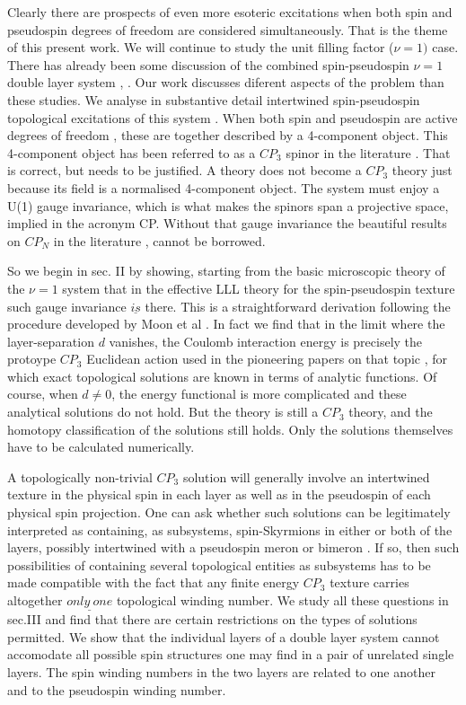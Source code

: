 Clearly there are prospects of even more esoteric excitations
when both spin and pseudospin degrees of freedom are considered
simultaneously. That is the theme of this present work. We will
continue to study the unit filling factor ($ \nu = 1 )$ case.
There has already been some discussion of the combined
spin-pseudospin $\nu = 1 $ double layer system \cite{Arov},
\cite{Ezawa}. Our work discusses diferent aspects of the
problem than these studies. We analyse in substantive detail
intertwined spin-pseudospin topological excitations of this
system . When both spin and pseudospin are active degrees of
freedom , these are together described by a 4-component object.
This 4-component object has been referred to as a $CP_{3}$
spinor in the literature \cite{Ezawa}. That is correct, but
needs to be justified. A theory does not become a $CP_{3}$
theory just because its field is a normalised 4-component
object. The system must enjoy a U(1) gauge invariance, which is
what makes the spinors span a projective space, implied in the
acronym CP. Without that gauge invariance the beautiful results
on $CP_{N}$ in the literature \cite{CP}, \cite{Raj} cannot be
borrowed. 

So we begin in sec. II by showing, starting from the basic
microscopic theory of the $\nu = 1 $ system that in the
effective LLL theory for the spin-pseudospin texture such
gauge invariance $\underline{is}$ there. This is a
straightforward derivation following the procedure developed by
Moon et al \cite{Moon}. In fact we find that in the limit where
the layer-separation $d$ vanishes, the Coulomb interaction
energy is precisely the protoype $CP_{3}$ Euclidean action used
in the pioneering papers on that topic \cite{CP}, for which
exact topological solutions are known in terms of analytic
functions. Of course, when $d\neq 0$, the energy functional is
more complicated and these analytical solutions do not hold.
But the theory is still a $CP_{3}$ theory, and the homotopy
classification of the solutions still holds. Only the solutions
themselves have to be calculated numerically. 

A topologically non-trivial $CP_{3}$ solution will generally
involve an intertwined texture in the physical spin in each
layer as well as in the pseudospin of each physical spin
projection. One can ask whether such solutions can be
legitimately interpreted as containing, as subsystems,
spin-Skyrmions in either or both of the layers, possibly
intertwined with a pseudospin meron or bimeron . If so, then
such possibilities of containing several topological entities
as subsystems has to be made compatible with the fact that any
finite energy $CP_{3}$ texture carries altogether
$\underline{only \ one}$ topological winding number. We study
all these questions in sec.III and find that there are certain
restrictions on the types of solutions permitted. We show that
the individual layers of a double layer system cannot accomodate
all possible spin structures one may find in a pair of unrelated
single layers. The spin winding numbers in the two layers are
related to one another and to the pseudospin winding number. 

